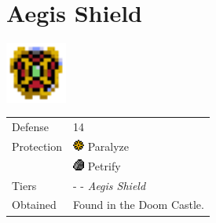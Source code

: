 \section{Aegis Shield}
\label{armor:aegis_shield}

\includegraphics[height=2cm,keepaspectratio]{./resources/armors/aegisshield}

\begin{longtable}{ l p{9cm} }
	Defense
	& 14
\\ %
	Protection
	& \includegraphics[height=1em,keepaspectratio]{./resources/effects/paralyze}
	Paralyze \\
	& \includegraphics[height=1em,keepaspectratio]{./resources/effects/petrify}
	Petrify
\\ %
	Tiers
	& \nameref{armor:steel_shield} - \nameref{armor:venus_shield} - \textit{Aegis Shield}
\\ %
	Obtained
	& Found in the Doom Castle.
\end{longtable}
